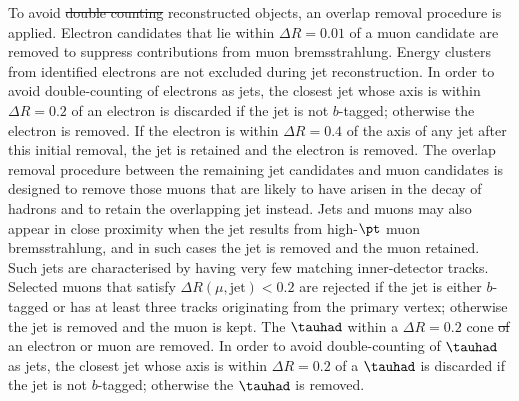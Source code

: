 \documentclass[PAPER, coverpage, atlasdraft=true, texlive=2016, UKenglish]{\ATLASLATEXPATH atlasdoc}
\providecommand{\DIFadd}[1]{{\protect\color{blue}\uwave{#1}}} %
\providecommand{\DIFdel}[1]{{\protect\color{red}\sout{#1}}}                      %
\providecommand{\DIFaddbegin}{} %
\providecommand{\DIFaddend}{} %
\providecommand{\DIFdelbegin}{} %
\providecommand{\DIFdelend}{} %
\begin{document}
To avoid \DIFdelbegin \DIFdel{double counting }\DIFdelend \DIFaddbegin \DIFadd{double-counting of }\DIFaddend reconstructed objects, an overlap removal procedure is applied.
Electron candidates that lie 
within $\Delta R = 0.01$ of a muon candidate are removed to suppress contributions from muon bremsstrahlung. 
Energy clusters from identified electrons are not excluded during jet reconstruction. 
In order to avoid double-counting of electrons as jets, the closest jet whose axis is within ${\Delta}R = 0.2$ of an electron 
is discarded if the jet is not $b$-tagged; otherwise the electron is removed.
If the electron is within ${\Delta}R = 0.4$ of the axis of any jet after this initial removal, the jet is retained and  the electron is removed.
The overlap removal procedure between the remaining jet candidates and muon candidates is designed to remove those muons 
that are likely to have arisen in the decay of hadrons and to retain the overlapping jet instead. 
Jets and muons may also appear in close proximity when the jet results from high-$\pt$ muon bremsstrahlung, 
and in such cases the jet is removed and the muon retained. Such jets are characterised by having very 
few matching inner-detector tracks. Selected muons that satisfy $\Delta R(\mu,{\textrm{jet}}) < 0.2$ are rejected
if the jet is either $b$-tagged or has at least three tracks originating from the primary vertex; otherwise the jet is removed and the muon is kept.
The $\tauhad$ within a $\Delta R=0.2$ cone \DIFdelbegin \DIFdel{of }\DIFdelend \DIFaddbegin \DIFadd{around }\DIFaddend an electron or muon are removed.
In order to avoid double-counting of $\tauhad$ as jets, the closest jet whose axis is
within ${\Delta}R = 0.2$ of a $\tauhad$ is discarded if the jet is not $b$-tagged; otherwise the $\tauhad$ is removed. 
\end{document}
